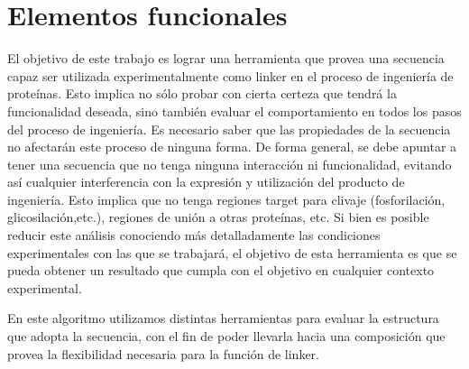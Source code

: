 \section{Elementos funcionales}



El objetivo de este trabajo es lograr una herramienta que provea una secuencia capaz ser utilizada experimentalmente como linker en el proceso de ingeniería de proteínas. 
Esto implica no sólo probar con cierta certeza que tendrá la funcionalidad deseada, sino también evaluar el comportamiento en todos los pasos del proceso de ingeniería. 
Es necesario saber que las propiedades de la secuencia no afectarán este proceso de ninguna forma.
De forma general, se debe apuntar a tener una secuencia que no tenga ninguna interacción ni funcionalidad, evitando así cualquier interferencia con la expresión y utilización del producto 
de ingeniería. Esto implica que no tenga regiones target para clivaje (fosforilación, glicosilación,etc.), regiones de unión a otras proteínas, etc.
Si bien es posible reducir este análisis conociendo más detalladamente las condiciones experimentales con las que se trabajará, el objetivo de esta herramienta es que se pueda obtener 
un resultado que cumpla con el objetivo en cualquier contexto experimental. 

En este algoritmo utilizamos distintas herramientas para evaluar la estructura que adopta la secuencia, con el fin de poder llevarla hacia una composición que provea la flexibilidad
necesaria para la función de linker. 





